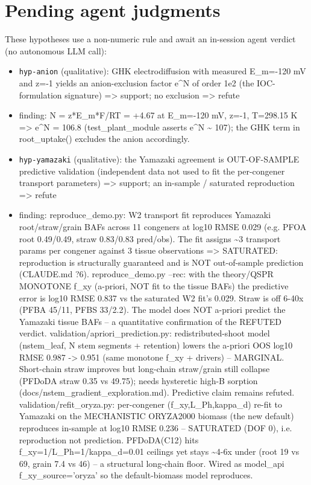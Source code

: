 \documentclass{article}
\begin{document}
\section{Pending agent judgments}
These hypotheses use a non-numeric rule and await an in-session agent verdict (no autonomous LLM call):
\begin{itemize}
  \item \texttt{hyp-anion} (qualitative): GHK electrodiffusion with measured E\_m=-120 mV and z=-1 yields an anion-exclusion factor e\textasciicircum{}N of order 1e2 (the IOC-formulation signature) => support; no exclusion => refute
  \item finding: N = z*E\_m*F/RT = +4.67 at E\_m=-120 mV, z=-1, T=298.15 K => e\textasciicircum{}N = 106.8 (test\_plant\_module asserts e\textasciicircum{}N \textasciitilde{} 107); the GHK term in root\_uptake() excludes the anion accordingly.
  \item \texttt{hyp-yamazaki} (qualitative): the Yamazaki agreement is OUT-OF-SAMPLE predictive validation (independent data not used to fit the per-congener transport parameters) => support; an in-sample / saturated reproduction => refute
  \item finding: reproduce\_demo.py: W2 transport fit reproduces Yamazaki root/straw/grain BAFs across 11 congeners at log10 RMSE 0.029 (e.g. PFOA root 0.49/0.49, straw 0.83/0.83 pred/obs). The fit assigns \textasciitilde{}3 transport params per congener against 3 tissue observations => SATURATED: reproduction is structurally guaranteed and is NOT out-of-sample prediction (CLAUDE.md ?6).
reproduce\_demo.py --rec: with the theory/QSPR MONOTONE f\_xy (a-priori, NOT fit to the tissue BAFs) the predictive error is log10 RMSE 0.837 vs the saturated W2 fit's 0.029. Straw is off 6-40x (PFBA 45/11, PFBS 33/2.2). The model does NOT a-priori predict the Yamazaki tissue BAFs -- a quantitative confirmation of the REFUTED verdict.
validation/apriori\_prediction.py: redistributed-shoot model (nstem\_leaf, N stem segments + retention) lowers the a-priori OOS log10 RMSE 0.987 -> 0.951 (same monotone f\_xy + drivers) -- MARGINAL. Short-chain straw improves but long-chain straw/grain still collapse (PFDoDA straw 0.35 vs 49.75); needs hysteretic high-B sorption (docs/nstem\_gradient\_exploration.md). Predictive claim remains refuted.
validation/refit\_oryza.py: per-congener (f\_xy,L\_Ph,kappa\_d) re-fit to Yamazaki on the MECHANISTIC ORYZA2000 biomass (the new default) reproduces in-sample at log10 RMSE 0.236 -- SATURATED (DOF 0), i.e. reproduction not prediction. PFDoDA(C12) hits f\_xy=1/L\_Ph=1/kappa\_d=0.01 ceilings yet stays \textasciitilde{}4-6x under (root 19 vs 69, grain 7.4 vs 46) -- a structural long-chain floor. Wired as model\_api f\_xy\_source='oryza' so the default-biomass model reproduces.

\end{itemize}
\end{document}
